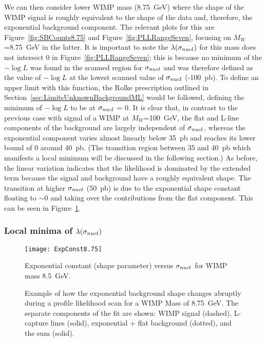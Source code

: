 We can then consider lower WIMP mass (8.75~GeV) where the shape of the WIMP signal is roughly equivalent to the shape of the data and, therefore, the exponential background component.  The relevant plots for this are Figure~\ref{fig:SBCounts8.75} and Figure~\ref{fig:PLLRangeSeven}, focusing on $M_{W}$=8.75~GeV in the latter.  It is important to note the $\lambda(\sigma_{nucl})$ for this mass does not intersect 0 in Figure~\ref{fig:PLLRangeSeven}; this is because no minimum of the $-\log L$ was found in the scanned region for $\sigma_{nucl}$ and was therefore defined as the value of $-\log L$ at the lowest scanned value of $\sigma_{nucl}$ (-100~pb).  To define an upper limit with this function, the Rolke prescription outlined in Section~\ref{sec:LimitsUnknownBackgroundML} would be followed, defining the minimum of $-\log L$ to be at $\sigma_{nucl}$ = 0.  It is clear that, in contrast to the previous case with signal of a WIMP at $M_{W}$=100~GeV, the flat and L-line components of the background are largely independent of $\sigma_{nucl}$, whereas the exponential component varies almost linearly below 35~pb and reaches its lower bound of 0 around 40~pb.  (The transition region between 35 and 40~pb which manifests a local minimum will be discussed in the following section.)  As before, the linear variation indicates that the likelihood is dominated by the extended term because the signal and background have a roughly equivalent shape.  The transition at higher $\sigma_{nucl}$ (50~pb) is due to the exponential shape constant floating to  $\sim0$ and taking over the contributions from the flat component.  This can be seen in Figure~\ref{fig:FitExpoShapeVsSigma}.
	
		\subsubsection{Local minima of $\lambda(\sigma_{nucl})$}
		\label{sec:LLPathoLocalMinima}
			
			\begin{figure}
				\centering
				\texttt{[image: ExpConst8.75]}
				\caption{Exponential constant (shape parameter) versus $\sigma_{nucl}$ for WIMP mass 8.5~GeV.}
				\label{fig:FitExpoShapeVsSigma}
			\end{figure}
	
			\begin{figure}
				\centering
				\caption{Example of how the exponential background shape changes abruptly during a profile 
				likelihood scan for a WIMP Mass of 8.75~GeV.  The separate components of the fit are shown: 
				WIMP signal (dashed), L-capture lines (solid), exponential + flat background (dotted), and the 
				sum (solid). }
				\label{fig:FitExpoFitExample}
			\end{figure}	

